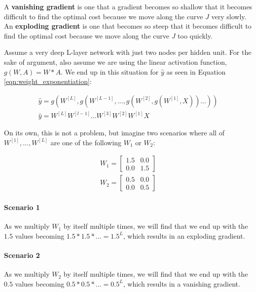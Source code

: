 \documentclass{article}
\begin{document}
A \textbf{vanishing gradient} is one that a gradient becomes so shallow that it becomes difficult to find the optimal cost because we move along the curve $J$ very slowly.  An \textbf{exploding gradient} is one that becomes so steep that it becomes difficult to find the optimal cost because we move along the curve $J$ too quickly.

Assume a very deep L-layer network with just two nodes per hidden unit.  For the sake of argument, also assume we are using the linear activation function, $g(W, A) = W * A$.  We end up in this situation for $\hat{y}$ as seen in Equation \ref{eqn:weight_exponentiation}:

\begin{gather}
\hat{y} = g(W^{[L]}, g(W^{[L-1]}, ..., g(W^{[2]}, g(W^{[1]}, X))...)) \\
\hat{y} = W^{[L]} W^{[l-1]} ... W^{[3]} W^{[2]} W^{[1]} X \label{eqn:weight_exponentiation}
\end{gather}

On its own, this is not a problem, but imagine two scenarios where all of $W^{[1]}, ..., W^{[L]}$ are one of the following $W_1$ or $W_2$:

\begin{gather}
W_1 = \begin{bmatrix}
1.5 & 0.0 \\
0.0 & 1.5
\end{bmatrix} \\
%
W_2 = \begin{bmatrix}
0.5 & 0.0 \\
0.0 & 0.5
\end{bmatrix}
\end{gather}

\paragraph{Scenario 1}

As we multiply $W_1$ by itself multiple times, we will find that we end up with the $1.5$ values becoming $1.5 * 1.5 * ... = 1.5^L$, which results in an exploding gradient.

\paragraph{Scenario 2}

As we multiply $W_2$ by itself multiple times, we will find that we end up with the $0.5$ values becoming $0.5 * 0.5 * ... = 0.5^L$, which results in a vanishing gradient.
\end{document}
